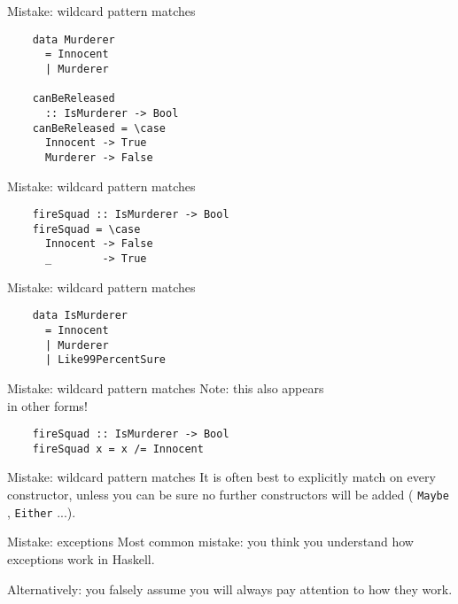 \documentclass[20pt]{beamer}
\newcommand{\vspaced}{
    \vspace{5mm}
}
\newcommand{\code}[1]{
    \texttt{\small{#1}}
}
\begin{document}

\begin{frame}[fragile]{Mistake: wildcard pattern matches}
    \begin{lstlisting}
    data Murderer
      = Innocent
      | Murderer

    canBeReleased
      :: IsMurderer -> Bool
    canBeReleased = \case
      Innocent -> True
      Murderer -> False
    \end{lstlisting}
\end{frame}

\begin{frame}[fragile]{Mistake: wildcard pattern matches}
    \begin{lstlisting}
    fireSquad :: IsMurderer -> Bool
    fireSquad = \case
      Innocent -> False
      _        -> True
    \end{lstlisting}
\end{frame}

\begin{frame}[fragile]{Mistake: wildcard pattern matches}
    \begin{lstlisting}
    data IsMurderer
      = Innocent
      | Murderer
      | Like99PercentSure
    \end{lstlisting}
\end{frame}

\begin{frame}[fragile]{Mistake: wildcard pattern matches}
    Note: this also appears \\
    in other forms!
    \vspaced
    \begin{lstlisting}
    fireSquad :: IsMurderer -> Bool
    fireSquad x = x /= Innocent
    \end{lstlisting}
\end{frame}

\begin{frame}{Mistake: wildcard pattern matches}
    It is often best to explicitly match on every constructor, unless you can be
    sure no further constructors will be added (\code{Maybe}, \code{Either}...).
\end{frame}


\begin{frame}{Mistake: exceptions}
    Most common mistake: you think you understand how exceptions work in
    Haskell. \\
    \vspaced
    \small{Alternatively: you falsely assume you will always pay attention
    to how they work.}
\end{frame}
\end{document}
